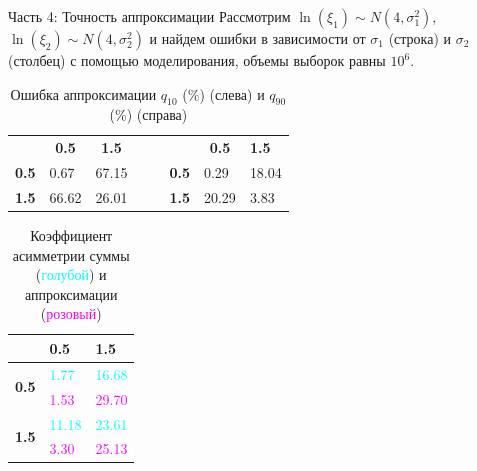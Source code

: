 \documentclass[ucs, notheorems, handout]{beamer}
\begin{document}
	\begin{frame}{Часть 4: Точность аппроксимации }
		Рассмотрим $\ln(\xi_{1}) \sim N(4, \sigma _{1}^{2})$, $\ln(\xi_{2}) \sim N(4, \sigma _{2}^{2})$ и найдем ошибки в зависимости от $\sigma_{1}$ (строка) и $\sigma_{2}$ (столбец) с помощью моделирования, объемы выборок равны $10^{6}$.
		
		\begin{table}[ht]
			\centering
			\caption{Ошибка аппроксимации $q_{10}$ ($\%$) (слева) и $q_{90}$ ($\%$) (справа)}
			\begin{tabular}{llrlllll}
				\cline{1-3} \cline{6-8}
				\multicolumn{1}{|c|}{}              & \multicolumn{1}{c|}{\textbf{0.5}} & \multicolumn{1}{c|}{\textbf{1.5}} &  & \multicolumn{1}{l|}{} & \multicolumn{1}{c|}{\textbf{}}     & \multicolumn{1}{c|}{\textbf{0.5}} & \multicolumn{1}{l|}{\textbf{1.5}} \\ \cline{1-3} \cline{6-8} 
				\multicolumn{1}{|c|}{\textbf{0.5}} & \multicolumn{1}{l|}{0.67}          & \multicolumn{1}{r|}{67.15}         &  & \multicolumn{1}{l|}{} & \multicolumn{1}{c|}{\textbf{0.5}} & \multicolumn{1}{l|}{0.29}          & \multicolumn{1}{l|}{18.04}         \\ \cline{1-3} \cline{6-8} 
				\multicolumn{1}{|c|}{\textbf{1.5}} & \multicolumn{1}{l|}{66.62}         & \multicolumn{1}{r|}{26.01}         &  & \multicolumn{1}{l|}{} & \multicolumn{1}{c|}{\textbf{1.5}} & \multicolumn{1}{l|}{20.29}         & \multicolumn{1}{l|}{3.83}          \\ \cline{1-3} \cline{6-8} 
			\end{tabular}
		\end{table}
	
	\begin{table}[]
		\caption{Коэффициент асимметрии суммы (\textcolor{cyan}{голубой}) и аппроксимации (\textcolor{magenta}{розовый})}
		\begin{tabular}{|c|l|l|}
			\hline
			& \textbf{0.5}  & \textbf{1.5} \\ \hline
			\multirow{2}{*}{\textbf{0.5}} & \textcolor{cyan}{1.77}          &  \textcolor{cyan}{16.68}        \\ \cline{2-3} 
			& \textcolor{magenta}{1.53}    &  \textcolor{magenta}{29.70}        \\ \hline
			\multirow{2}{*}{\textbf{1.5}}  & \textcolor{cyan}{11.18}         &  \textcolor{cyan}{23.61}        \\ \cline{2-3} 
			& \textcolor{magenta}{3.30}         & \textcolor{magenta}{25.13}        \\ \hline
		\end{tabular}
	\end{table}
		

\end{frame}
\end{document}
